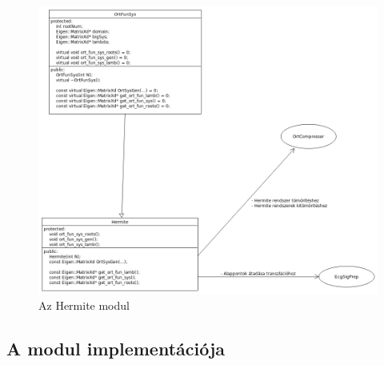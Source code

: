 \documentclass[oneside,titlepage,12pt,a4paper]{report}
\begin{document}
\begin{figure}[H] \label{HermiteUML}
\begin{center}
  \includegraphics[width=150mm]{./Abrak/UML/Hermite.png}
  \caption{Az Hermite modul}
\end{center}
\end{figure} 
 

\subsection*{A modul implementációja}
\end{document}
